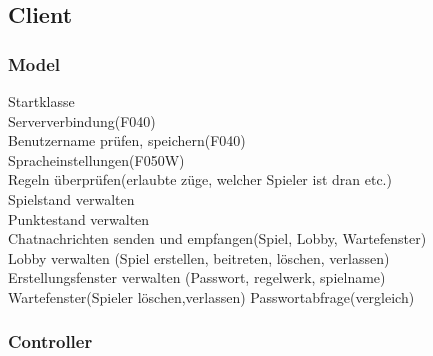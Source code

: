 \documentclass{article}
\begin{document}
	\subsection{Client}
	\subsubsection{Model}
		Startklasse \\
		Serververbindung(F040)\\
		Benutzername prüfen, speichern(F040)\\
		Spracheinstellungen(F050W) \\
		Regeln überprüfen(erlaubte züge, welcher Spieler ist dran etc.)\\
		Spielstand verwalten \\
		Punktestand verwalten\\
		Chatnachrichten senden und empfangen(Spiel, Lobby, Wartefenster) \\
		Lobby	verwalten (Spiel erstellen, beitreten, löschen, verlassen)\\	
		Erstellungsfenster verwalten (Passwort, regelwerk, spielname)\\
		Wartefenster(Spieler löschen,verlassen)
		Passwortabfrage(vergleich)\\
	\subsubsection{Controller}
\end{document}
